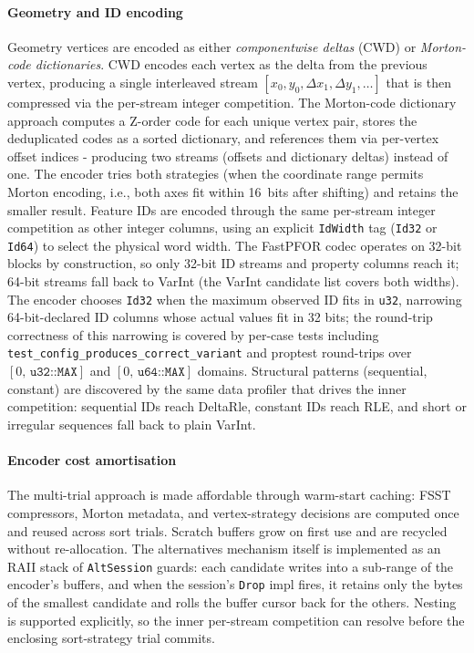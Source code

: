 \paragraph{Geometry and ID encoding}
Geometry vertices are encoded as either \emph{componentwise deltas} (CWD) or \emph{Morton-code dictionaries}.
CWD encodes each vertex as the delta from the previous vertex, producing a single interleaved stream $[x_0, y_0, \Delta x_1, \Delta y_1, \ldots]$ that is then compressed via the per-stream integer competition.
The Morton-code dictionary approach computes a Z-order code for each unique vertex pair, stores the deduplicated codes as a sorted dictionary, and references them via per-vertex offset indices - producing two streams (offsets and dictionary deltas) instead of one.
The encoder tries both strategies (when the coordinate range permits Morton encoding, i.e., both axes fit within 16~bits after shifting) and retains the smaller result.
Feature IDs are encoded through the same per-stream integer competition as other integer columns, using an explicit \texttt{IdWidth} tag (\texttt{Id32} or \texttt{Id64}) to select the physical word width.
The \ac{FastPFOR} codec operates on 32-bit blocks by construction, so only 32-bit ID streams and property columns reach it; 64-bit streams fall back to \ac{VarInt} (the \ac{VarInt} candidate list covers both widths).
The encoder chooses \texttt{Id32} when the maximum observed ID fits in \texttt{u32}, narrowing 64-bit-declared ID columns whose actual values fit in 32 bits; the round-trip correctness of this narrowing is covered by per-case tests including \texttt{test\_config\_produces\_correct\_variant} and proptest round-trips over $[0,\,\texttt{u32::MAX}]$ and $[0,\,\texttt{u64::MAX}]$ domains.
Structural patterns (sequential, constant) are discovered by the same data profiler that drives the inner competition: sequential IDs reach DeltaRle, constant IDs reach \ac{RLE}, and short or irregular sequences fall back to plain \ac{VarInt}.

\paragraph{Encoder cost amortisation}
The multi-trial approach is made affordable through warm-start caching: \ac{FSST} compressors, Morton metadata, and vertex-strategy decisions are computed once and reused across sort trials.
Scratch buffers grow on first use and are recycled without re-allocation.
The alternatives mechanism itself is implemented as an RAII stack of \texttt{AltSession} guards: each candidate writes into a sub-range of the encoder's buffers, and when the session's \texttt{Drop} impl fires, it retains only the bytes of the smallest candidate and rolls the buffer cursor back for the others.
Nesting is supported explicitly, so the inner per-stream competition can resolve before the enclosing sort-strategy trial commits.

